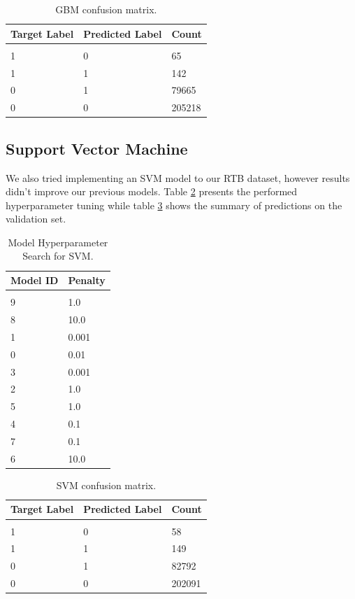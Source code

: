\documentclass{article} %
\begin{document}
\begin{table}[!htbp]
\caption{GBM confusion matrix.}
\label{table:26}
\begin{center}
\begin{tabular}{l l l}
\multicolumn{1}{c}{\bf Target Label} & \multicolumn{1}{c}{\bf Predicted Label} & \multicolumn{1}{c}{\bf Count}
\\ \hline \\
1 & 0 & 65\\
1 & 1 & 142\\
0 & 1 & 79665\\
0 & 0 & 205218\\
\end{tabular}
\end{center}
\end{table}

\subsection{Support Vector Machine}

We also tried implementing an SVM model to our RTB dataset, however results didn't improve our previous models. Table \ref{table:27} presents the performed hyperparameter tuning while table \ref{table:28} shows the summary of predictions on the validation set.

\begin{table}[!htbp]
\caption{Model Hyperparameter Search for SVM.}
\label{table:27}
\begin{center}
\begin{tabular}{l l}
\multicolumn{1}{c}{\bf Model ID} & \multicolumn{1}{c}{\bf Penalty}
\\ \hline \\
9 & 1.0\\
8 & 10.0\\
1 & 0.001\\
0 & 0.01\\
3 & 0.001\\
2 & 1.0\\
5 & 1.0\\
4 & 0.1\\
7 & 0.1\\
6 & 10.0\\
\end{tabular}
\end{center}
\end{table}

\begin{table}[!htbp]
\caption{SVM confusion matrix.}
\label{table:28}
\begin{center}
\begin{tabular}{l l l}
\multicolumn{1}{c}{\bf Target Label} & \multicolumn{1}{c}{\bf Predicted Label} & \multicolumn{1}{c}{\bf Count}
\\ \hline \\
1 & 0 & 58\\
1 & 1 & 149\\
0 & 1 & 82792\\
0 & 0 & 202091\\
\end{tabular}
\end{center}
\end{table}
\end{document}
